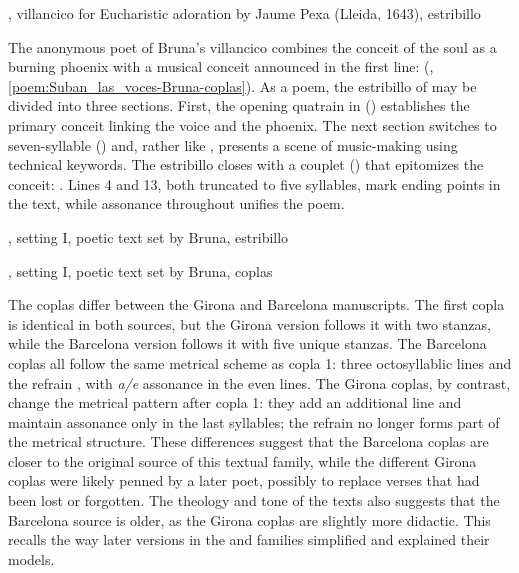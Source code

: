 
{, villancico for Eucharistic adoration by Jaume Pexa
(Lleida, 1643), estribillo}

The anonymous poet of Bruna's villancico combines the conceit of the soul as a
burning phoenix with a musical conceit announced in the first line:  (,
\ref{poem:Suban_las_voces-Bruna-coplas}).
As a poem, the estribillo of  may be divided into three
sections. 
First, the opening quatrain in  () establishes
the primary conceit linking the voice and the phoenix.
The next section switches to seven-syllable 
() and, rather like , presents
a scene of music-making using technical keywords.
The estribillo closes with a couplet () that epitomizes the
conceit: .
Lines 4 and 13, both truncated to five syllables, mark ending points in the
text, while assonance throughout unifies the poem.


{, setting I, poetic text set by Bruna,
estribillo}

{, setting I, poetic text set by Bruna, coplas}

The coplas differ between the Girona and Barcelona manuscripts.
The first copla is identical in both sources, but the Girona version follows it
with two stanzas, while the Barcelona version follows it with five unique
stanzas.
The Barcelona coplas all follow the same metrical scheme as copla 1: three
octosyllablic lines and the refrain , with \emph{a/e} assonance
in the even lines.
The Girona coplas, by contrast, change the metrical pattern after copla 1: they
add an additional line and maintain assonance only in the last syllables; the
 refrain no longer forms part of the metrical structure.
These differences suggest that the Barcelona coplas are closer to the original
source of this textual family, while the different Girona coplas were likely
penned by a later poet, possibly to replace verses that had been lost or
forgotten.
The theology and tone of the texts also suggests that the Barcelona source is
older, as the Girona coplas are slightly more didactic.
This recalls the way later versions in the  and  families simplified and explained their
models.

